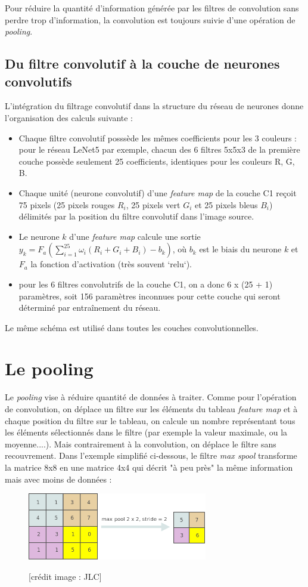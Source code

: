 \documentclass{article}
\begin{document}
Pour réduire la quantité d'information générée par les filtres 
de convolution sans perdre trop d'information, 
la convolution est toujours suivie d'une opération de \textit{pooling}.

\subsection{Du filtre convolutif à la couche de neurones convolutifs}

L'intégration du filtrage convolutif dans la structure du réseau de neurones donne l'organisation des calculs  suivante :

\begin{itemize}
\item Chaque filtre convolutif posssède les mêmes coefficients pour les 3 couleurs : 
pour le réseau LeNet5 par exemple, chacun des 6 filtres 5x5x3 de la première couche 
possède seulement 25 coefficients, identiques pour les couleurs R, G, B.
\item Chaque unité (neurone convolutif) d'une \textit{feature map} de la couche C1 reçoit 75 pixels
(25 pixels rouges $R_i$, 25 pixels vert $G_i$ et 25 pixels bleus $B_i$) 
délimités par la position du filtre convolutif dans l'image source.
\item Le neurone $k$ d'une \textit{feature map} calcule une sortie 
$y_k = F_a(\sum_{i=1}^{25}{\omega_i(R_i + G_i + B_i) - b_k})$, 
où $b_k$ est le biais du neurone $k$ et $F_a$ la fonction d'activation (très souvent `relu`).
\item pour les 6 filtres convolutrifs de la couche C1, on a donc  6 x (25 + 1) paramètres, 
soit 156 paramètres inconnues pour cette couche qui seront déterminé par entraînement du réseau.
\end{itemize}


Le même schéma est utilisé dans toutes les couches convolutionnelles.


\section{Le pooling}

Le \textit{pooling} vise à réduire quantité de données à traiter. 
Comme pour l'opération de convolution, on déplace un filtre 
sur les éléments du tableau \textit{feature map} et à chaque position 
du filtre sur le tableau, on calcule un nombre représentant tous 
les éléments sélectionnés dans le filtre (par exemple la valeur maximale, ou la moyenne....). 
Mais contrairement à la convolution, on déplace le filtre sans recouvrement.
Dans l'exemple simplifié ci-dessous, le filtre \textit{max spool} 
transforme la matrice 8x8 en une matrice 4x4 qui décrit 
"à peu près" la même information mais avec moins de données :

\begin{figure}[H]
\centering
\includegraphics[width=0.7\textwidth]{img/max_pool_2x2.png}

\medskip

[crédit image : JLC]    
\end{figure}
\end{document}
